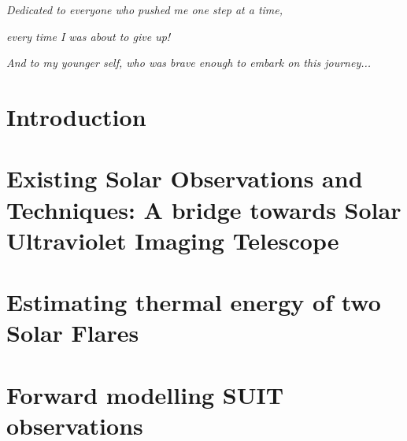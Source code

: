 \documentclass[plain]{hvdthesis}
\begin{document}
\vspace*{\fill}
{\centerline {\em Dedicated to everyone who pushed me one step at a time,}} 
{\centerline {\em every time I was about to give up!}}
{\centerline {\em And to my younger self, who was brave enough to embark on this journey...}}
\vspace*{\fill}


\mainmatter
\pagestyle{fancy}


%
%

\chapter[Introduction]{Introduction}\label{c:intro}

\clearpage
%
\chapter{Existing Solar Observations and Techniques: A bridge towards Solar Ultraviolet Imaging Telescope}\label{c:chap2}

\clearpage
%
\chapter{Estimating thermal energy of two Solar Flares}\label{c:chap3}

\clearpage

\chapter{Forward modelling SUIT observations}\label{c:chap4}

%
\end{document}
